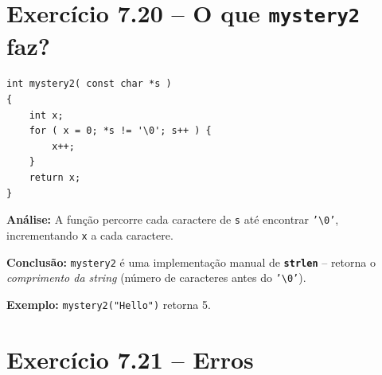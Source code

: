\documentclass[12pt,a4paper]{article}
\begin{document}
\section{Exercício 7.20 -- O que \texttt{mystery2} faz?}

\begin{respostabox}
\begin{lstlisting}
int mystery2( const char *s )
{
    int x;
    for ( x = 0; *s != '\0'; s++ ) {
        x++;
    }
    return x;
}
\end{lstlisting}

\textbf{Análise:} A função percorre cada caractere de \texttt{s} até encontrar
\texttt{'\textbackslash 0'}, incrementando \texttt{x} a cada caractere.

\textbf{Conclusão:} \texttt{mystery2} é uma implementação manual de \textbf{\texttt{strlen}} --
retorna o \textit{comprimento da string} (número de caracteres antes do
\texttt{'\textbackslash 0'}).

\textbf{Exemplo:} \texttt{mystery2("Hello")} retorna 5.
\end{respostabox}

\newpage

\section{Exercício 7.21 -- Erros}
\end{document}
